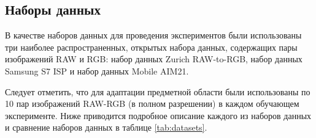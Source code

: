 \subsection{Наборы данных}\label{sect-5-2}

В качестве наборов данных для проведения экспериментов были использованы три наиболее распространенных, открытых набора данных, содержащих пары изображений RAW и RGB: набор данных Zurich RAW-to-RGB, набор данных Samsung S7 ISP и набор данных Mobile AIM21.

Следует отметить, что для адаптации предметной области были использованы по 10 пар изображений RAW-RGB (в полном разрешении) в каждом обучающем эксперименте. Ниже приводится подробное описание каждого из наборов данных и сравнение наборов данных в таблице \ref{tab:datasets}.






